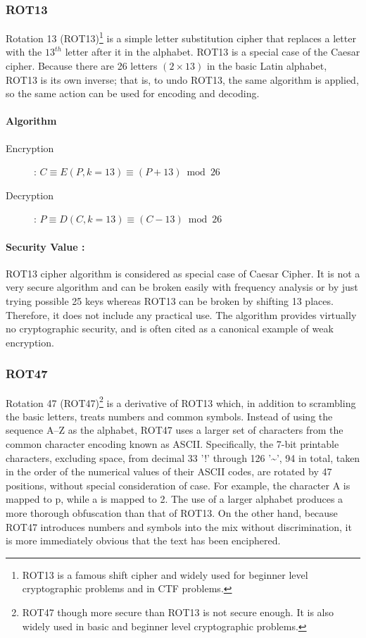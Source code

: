 \documentclass[british]{article}
\begin{document}
\subsubsection{ROT13}

Rotation 13 (ROT13)\footnote{ROT13 is a famous shift cipher and widely used for beginner level
cryptographic problems and in CTF problems.} is a simple letter substitution cipher that replaces a letter with
the $13^{th}$ letter after it in the alphabet. ROT13 is a special
case of the Caesar cipher. Because there are 26 letters $(2\times13)$
in the basic Latin alphabet, ROT13 is its own inverse; that is, to
undo ROT13, the same algorithm is applied, so the same action can
be used for encoding and decoding.

\paragraph{Algorithm}
\begin{description}
\item [{Encryption}] : $C \equiv E(P,k=13) \equiv (P+13) \bmod 26$
\item [{Decryption}] : $P \equiv D(C,k=13) \equiv (C-13) \bmod 26$
\end{description}

\paragraph{Security Value : }

ROT13 cipher algorithm is considered as special case of Caesar Cipher.
It is not a very secure algorithm and can be broken easily with frequency
analysis or by just trying possible 25 keys whereas ROT13 can be broken
by shifting 13 places. Therefore, it does not include any practical
use. The algorithm provides virtually no cryptographic security, and
is often cited as a canonical example of weak encryption.

\subsubsection{ROT47}

Rotation 47 (ROT47)\footnote{ROT47 though more secure than ROT13 is not secure enough. It is also
widely used in basic and beginner level cryptographic problems.} is a derivative of ROT13 which, in addition to scrambling the basic
letters, treats numbers and common symbols. Instead of using the sequence
A--Z as the alphabet, ROT47 uses a larger set of characters from
the common character encoding known as ASCII. Specifically, the 7-bit
printable characters, excluding space, from decimal 33 '!' through
126 '\textasciitilde ', 94 in total, taken in the order of the numerical
values of their ASCII codes, are rotated by 47 positions, without
special consideration of case. For example, the character A is mapped
to p, while a is mapped to 2. The use of a larger alphabet produces
a more thorough obfuscation than that of ROT13. On the other hand,
because ROT47 introduces numbers and symbols into the mix without
discrimination, it is more immediately obvious that the text has been
enciphered.
\end{document}
